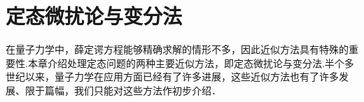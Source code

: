 \chapter{定态微扰论与变分法}\label{chp:06}

在量子力学中，薛定谔方程能够精确求解的情形不多，因此近似方法具有特殊的重要性.本章介绍处理定态问题的两种主要近似方法，即定态微扰论与变分法.半个多世纪以来，量子力学在应用方面已经有了许多进展，这些近似方法也有了许多发展、限于篇幅，我们只能对这些方法作初步介绍．









